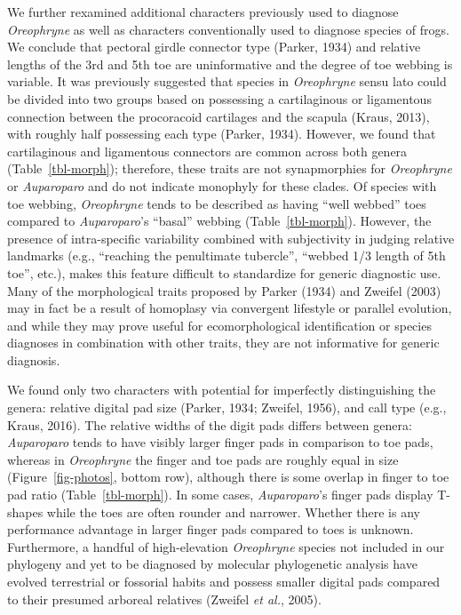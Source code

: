 \documentclass[
  letterpaper,
  DIV=11,
  numbers=noendperiod]{scrartcl}
\begin{document}
We further rexamined additional characters previously used to diagnose
\emph{Oreophryne} as well as characters conventionally used to diagnose
species of frogs. We conclude that pectoral girdle connector type
(Parker, 1934) and relative lengths of the 3rd and 5th toe are
uninformative and the degree of toe webbing is variable. It was
previously suggested that species in \emph{Oreophryne} sensu lato could
be divided into two groups based on possessing a cartilaginous or
ligamentous connection between the procoracoid cartilages and the
scapula (Kraus, 2013), with roughly half possessing each type (Parker,
1934). However, we found that cartilaginous and ligamentous connectors
are common across both genera (Table~\ref{tbl-morph}); therefore, these
traits are not synapmorphies for \emph{Oreophryne} or \emph{Auparoparo}
and do not indicate monophyly for these clades. Of species with toe
webbing, \emph{Oreophryne} tends to be described as having ``well
webbed'' toes compared to \emph{Auparoparo}'s ``basal'' webbing
(Table~\ref{tbl-morph}). However, the presence of intra-specific
variability combined with subjectivity in judging relative landmarks
(e.g., ``reaching the penultimate tubercle'', ``webbed 1/3 length of 5th
toe'', etc.), makes this feature difficult to standardize for generic
diagnostic use. Many of the morphological traits proposed by Parker
(1934) and Zweifel (2003) may in fact be a result of homoplasy via
convergent lifestyle or parallel evolution, and while they may prove
useful for ecomorphological identification or species diagnoses in
combination with other traits, they are not informative for generic
diagnosis.

We found only two characters with potential for imperfectly
distinguishing the genera: relative digital pad size (Parker, 1934;
Zweifel, 1956), and call type (e.g., Kraus, 2016). The relative widths
of the digit pads differs between genera: \emph{Auparoparo} tends to
have visibly larger finger pads in comparison to toe pads, whereas in
\emph{Oreophryne} the finger and toe pads are roughly equal in size
(Figure~\ref{fig-photos}, bottom row), although there is some overlap in
finger to toe pad ratio (Table~\ref{tbl-morph}). In some cases,
\emph{Auparoparo}'s finger pads display T-shapes while the toes are
often rounder and narrower. Whether there is any performance advantage
in larger finger pads compared to toes is unknown. Furthermore, a
handful of high-elevation \emph{Oreophryne} species not included in our
phylogeny and yet to be diagnosed by molecular phylogenetic analysis
have evolved terrestrial or fossorial habits and possess smaller digital
pads compared to their presumed arboreal relatives (Zweifel \emph{et
al.}, 2005).
\end{document}
